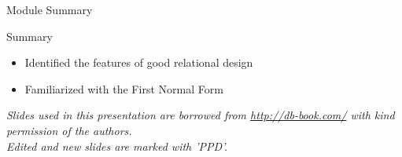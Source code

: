 \documentclass[aspectratio=169, xcolor=dvipsnames]{beamer}
\begin{document}
\begin{frame}{Module Summary}
    \begin{block}{Summary}
        \begin{itemize}[<+->]
            \item Identified the features of good relational design
            \item Familiarized with the First Normal Form
        \end{itemize}
    \end{block}
    \vspace{2em}
    \begin{center}
    \small \textit{Slides used in this presentation are borrowed from \url{http://db-book.com/} with kind permission of the authors.} \\
    \small \textit{Edited and new slides are marked with 'PPD'.}
    \end{center}
\end{frame}
\end{document}
